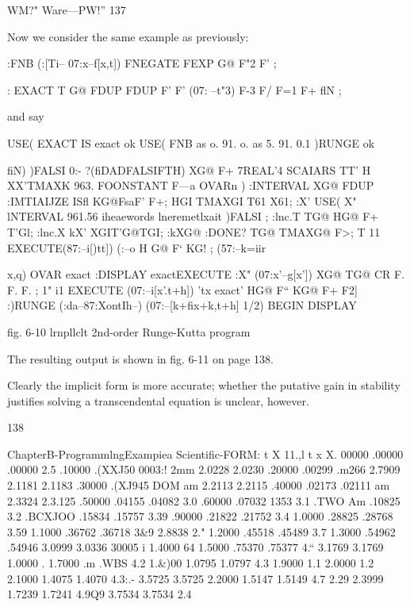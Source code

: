 {WM?" Ware—PW!” 137

Now we consider the same example as previously:

:FNB (:[Ti-- 07:x--f[x,t])
FNEGATE FEXP G@ F"2 F' ;

: EXACT T G@ FDUP FDUP F' F' (07: --t"3)
F-3 F/ F=1 F+ flN ;

and say

USE( EXACT IS exact ok
USE( FNB as o. 91. o. as 5. 91. 0.1 )RUNGE ok

 

fiN) )FALSI 0:- ?(fiDADFALSIFTH) XG@ F+
7REAL'4 SCAIARS TT' H XX'TMAXK 963. FOONSTANT F—a
OVARn \tohoidciaotiou) :INTERVAL XG@ FDUP
:IMTIAIJZE ISfl KG@FsaF' F+;
HGI TMAXGI T61 X61;
:X' USE( X" lNTERVAL 961.56
\‘iheaewords lneremetlxait )FALSI ;
:lnc.T TG@ HG@ F+ T'Gl; :lnc.X kX’ XGIT'G@TGI;
:kXG@ :DONE? TG@ TMAXG@ F>;
T 11 EXECUTE(87:--i[)tt]) (:--o
H G@ F‘ KG! ; (57:--k=iir{x,q) OVAR exact \cia
:DISPLAY exactEXECUTE
:X" (07:x'--g[x’]) XG@ TG@ CR F. F. F. ;
1" i1 EXECUTE (07:--i[x'.t+h]) \eml'tx exact'
HG@ F“ KG@ F+ F2] :)RUNGE (:da--87:XontIh--)
(07:--[k+fix+k,t+h] 1/2) BEGIN DISPLAY

 

 

 

 

fig. 6-10 lrnpllclt 2nd-order Runge-Kutta program

The resulting output is shown in fig. 6-11 on page 138.

Clearly the implicit form is more accurate; whether the putative gain
in stability justifies solving a transcendental equation is unclear,
however.

138

 

ChapterB-ProgrammlngExampiea Scientific-FORM:
t X 11.,l t x X.
00000 .00000 .00000 2.5%
.10000 .(XXJ50 0003:! 2mm 2.0228 2.0230
.20000 .00299 .m266 2.7909 2.1181 2.1183
.30000 .(XJ945 DOM am 2.2113 2.2115
.40000 .02173 .02111 am 2.3324 2.3.125
.50000 .04155 .04082 3.0%
.60000 .07032 1353 3.1%
.TWO Am .10825 3.2%
.BCXJOO .15834 .15757 3.39%
.90000 .21822 .21752 3.4%
1.0000 .28825 .28768 3.59%
1.1000 .36762 .36718 3&9 2.8838 2."
1.2000 .45518 .45489 3.7%
1.3000 .54962 .54946 3.0999 3.0336 30005 i
1.4000 64%
1.5000 .75370 .75377 4.“ 3.1769 3.1769
1.0000 .%
1.7000 .m .WBS 4.2%
1.&)00 1.0795 1.0797 4.3%
1.9000 1.1%
2.0000 1.2%
2.1000 1.4075 1.4070 4.3:.- 3.5725 3.5725
2.2000 1.5147 1.5149 4.7%
2.29%
2.3999 1.7239 1.7241 4.9Q9 3.7534 3.7534
2.4%

}}
